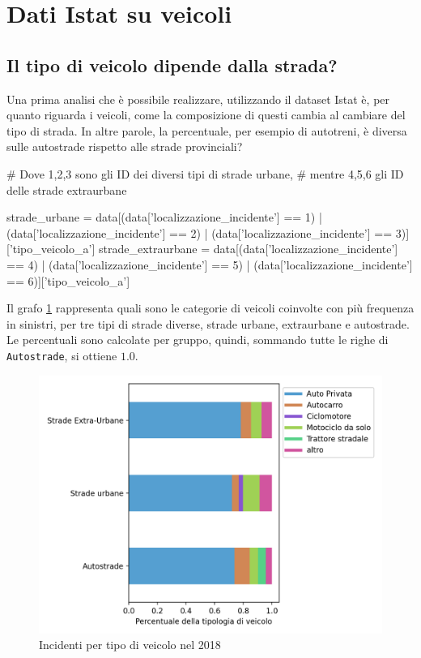 \documentclass[a4paper,12pt]{report}
\newcommand{\columnstyle}[1]{\texttt{#1}}
\begin{document}
\section{Dati Istat su veicoli}

\subsection{Il tipo di veicolo dipende dalla strada?}

Una prima analisi che è possibile realizzare, utilizzando il dataset Istat è, 
per quanto riguarda i veicoli, 
come la composizione di questi cambia al cambiare del tipo di strada. 
In altre parole, la percentuale, per esempio di autotreni, è diversa sulle autostrade 
rispetto alle strade provinciali? 

\begin{code}[language=Python]
# Dove 1,2,3 sono gli ID dei diversi tipi di strade urbane, 
# mentre 4,5,6 gli ID delle strade extraurbane

strade_urbane = data[(data['localizzazione_incidente'] == 1) | (data['localizzazione_incidente'] == 2) | (data['localizzazione_incidente'] == 3)]['tipo_veicolo_a']
strade_extraurbane = data[(data['localizzazione_incidente'] == 4) | (data['localizzazione_incidente'] == 5) | (data['localizzazione_incidente'] == 6)]['tipo_veicolo_a']
\end{code}

Il grafo \ref{fig:differenza-strade} rappresenta quali sono le categorie di veicoli 
coinvolte con più frequenza in sinistri, per tre tipi di strade diverse, strade urbane, 
extraurbane e autostrade. 
Le percentuali sono calcolate per gruppo, quindi, sommando 
tutte le righe di \columnstyle{Autostrade}, si ottiene $1.0$.

\begin{figure}
    \includegraphics[width=\linewidth]{../src/incidenti/incidenti_senza_coords/tipo_veicoli/differenza_strade.png}
    \caption{Incidenti per tipo di veicolo nel 2018}
    \label{fig:differenza-strade}
\end{figure}
\end{document}

